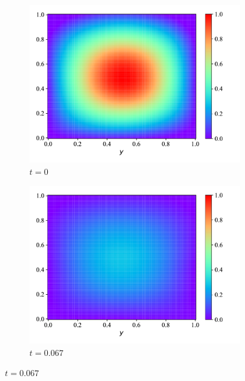 \begin{figure}[H]
     \centering
     \begin{subfigure}[b]{0.45\textwidth}
         \centering
         \includegraphics[width=\textwidth]{Figures/InitialExperiments/heat2d_1_discovery.pdf}
         \caption{$t = 0$}
         \label{fig:heat2d_1_discovery}
     \end{subfigure}
     \hfill
     \begin{subfigure}[b]{0.45\textwidth}
         \centering
         \includegraphics[width=\textwidth]{Figures/InitialExperiments/heat2d_2_discovery.pdf}
         \caption{$t = 0.067$}
         \label{fig:heat2d_2_discovery}
     \end{subfigure}

\end{figure}
